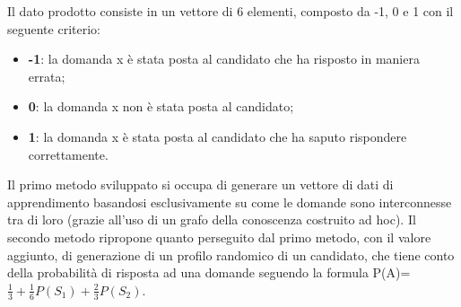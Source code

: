 Il dato prodotto consiste in un vettore di 6 elementi, composto da  -1, 0 e 1 con il seguente criterio:
\begin{itemize}
\item \textbf{-1}: la domanda x \`e stata posta al candidato che ha risposto in maniera errata;
\item \textbf{0}: la domanda x non \`e stata posta al candidato;
\item \textbf{1}: la domanda x \`e stata posta al candidato che ha saputo rispondere correttamente.
\end{itemize}
\noindent
Il primo metodo sviluppato si occupa di generare un vettore di dati di apprendimento basandosi esclusivamente su come le domande sono interconnesse tra di loro (grazie all'uso di un grafo della conoscenza costruito ad hoc). Il secondo metodo ripropone quanto perseguito dal primo metodo, con il valore aggiunto, di generazione di un profilo randomico di un candidato, che tiene conto della  probabilit\`a di risposta ad una domande seguendo la formula P(A)= $\frac{1}{3}+\frac{1}{6}P(S_1)+\frac{2}{3}P(S_2)$.

